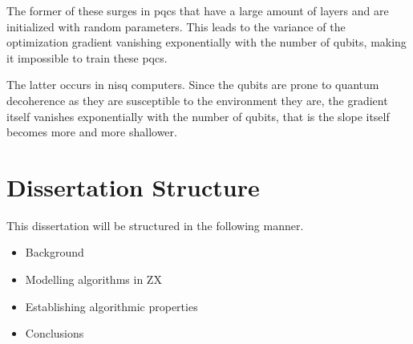 The former of these surges in \acrshort{pqc}s that have a large amount of layers and are initialized with random parameters. This leads to the variance of the optimization gradient vanishing exponentially with the number of qubits, making it impossible to train these \acrshort{pqc}s.

The latter occurs in \acrshort{nisq} computers. Since the qubits are prone to quantum decoherence as they are susceptible to the environment they are, the gradient itself vanishes exponentially with the number of qubits, that is the slope itself becomes more and more shallower.

\section{Dissertation Structure}

This dissertation will be structured in the following manner.

\begin{itemize}
    \item Background

    \item Modelling algorithms in ZX


    \item Establishing algorithmic properties


    \item Conclusions

\end{itemize}